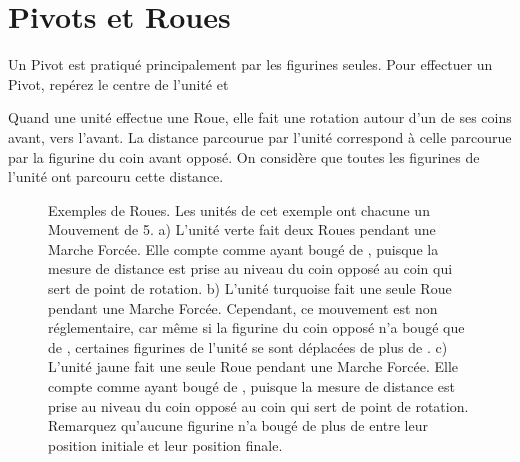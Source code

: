 \newpage
\section{Pivots et Roues}

Un Pivot est pratiqué principalement par les figurines seules. Pour effectuer un Pivot, repérez le centre de l'unité et 

Quand une unité effectue une Roue, elle fait une rotation autour d'un de ses coins avant, vers l'avant. La distance parcourue par l'unité correspond à celle parcourue par la figurine du coin avant opposé. On considère que toutes les figurines de l'unité ont parcouru cette distance.

\newcommand{\wheelsA}{a)}
\newcommand{\wheelsB}{b)}
\newcommand{\wheelsC}{c)}

\begin{figure}[!htbp]
\centering
\def\svgwidth{\textwidth}

\caption{Exemples de Roues.\vspace*{10pt}\newline
Les unités de cet exemple ont chacune un Mouvement de 5.\vspace*{10pt}\newline
a) L'unité verte fait deux Roues pendant une Marche Forcée. Elle compte comme ayant bougé de , puisque la mesure de distance est prise au niveau du coin opposé au coin qui sert de point de rotation.\vspace*{10pt}\newline
b) L'unité turquoise fait une seule Roue pendant une Marche Forcée. Cependant, ce mouvement est non réglementaire, car même si la figurine du coin opposé n'a bougé que de , certaines figurines de l'unité se sont déplacées de plus de .\vspace*{10pt}\newline
c) L'unité jaune fait une seule Roue pendant une Marche Forcée. Elle compte comme ayant bougé de , puisque la mesure de distance est prise au niveau du coin opposé au coin qui sert de point de rotation. Remarquez qu'aucune figurine n'a bougé de plus de  entre leur position initiale et leur position finale.}
\label{figure/wheels}
\end{figure}
